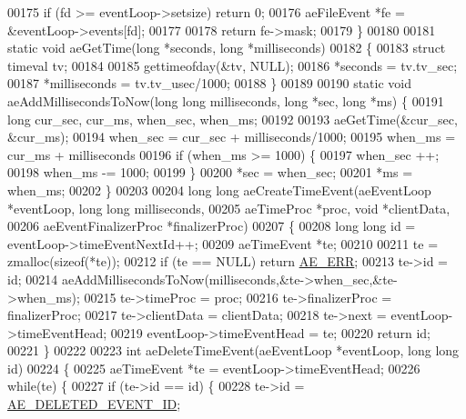 \begin{DoxyCode}
00175     \textcolor{keywordflow}{if} (fd >= eventLoop->setsize) \textcolor{keywordflow}{return} 0;
00176     aeFileEvent *fe = &eventLoop->events[fd];
00177 
00178     \textcolor{keywordflow}{return} fe->mask;
00179 \}
00180 
00181 \textcolor{keyword}{static} \textcolor{keywordtype}{void} aeGetTime(\textcolor{keywordtype}{long} *seconds, \textcolor{keywordtype}{long} *milliseconds)
00182 \{
00183     \textcolor{keyword}{struct} timeval tv;
00184 
00185     gettimeofday(&tv, NULL);
00186     *seconds = tv.tv\_sec;
00187     *milliseconds = tv.tv\_usec/1000;
00188 \}
00189 
00190 \textcolor{keyword}{static} \textcolor{keywordtype}{void} aeAddMillisecondsToNow(\textcolor{keywordtype}{long} \textcolor{keywordtype}{long} milliseconds, \textcolor{keywordtype}{long} *sec, \textcolor{keywordtype}{long} *ms) \{
00191     \textcolor{keywordtype}{long} cur\_sec, cur\_ms, when\_sec, when\_ms;
00192 
00193     aeGetTime(&cur\_sec, &cur\_ms);
00194     when\_sec = cur\_sec + milliseconds/1000;
00195     when\_ms = cur\_ms + milliseconds%
00196     \textcolor{keywordflow}{if} (when\_ms >= 1000) \{
00197         when\_sec ++;
00198         when\_ms -= 1000;
00199     \}
00200     *sec = when\_sec;
00201     *ms = when\_ms;
00202 \}
00203 
00204 \textcolor{keywordtype}{long} \textcolor{keywordtype}{long} aeCreateTimeEvent(aeEventLoop *eventLoop, \textcolor{keywordtype}{long} \textcolor{keywordtype}{long} milliseconds,
00205         aeTimeProc *proc, \textcolor{keywordtype}{void} *clientData,
00206         aeEventFinalizerProc *finalizerProc)
00207 \{
00208     \textcolor{keywordtype}{long} \textcolor{keywordtype}{long} id = eventLoop->timeEventNextId++;
00209     aeTimeEvent *te;
00210 
00211     te = zmalloc(\textcolor{keyword}{sizeof}(*te));
00212     \textcolor{keywordflow}{if} (te == NULL) \textcolor{keywordflow}{return} \hyperlink{ae_8h_aa16dcf7effdf8f8df97f51b1cb51a9df}{AE\_ERR};
00213     te->id = id;
00214     aeAddMillisecondsToNow(milliseconds,&te->when\_sec,&te->when\_ms);
00215     te->timeProc = proc;
00216     te->finalizerProc = finalizerProc;
00217     te->clientData = clientData;
00218     te->next = eventLoop->timeEventHead;
00219     eventLoop->timeEventHead = te;
00220     \textcolor{keywordflow}{return} id;
00221 \}
00222 
00223 \textcolor{keywordtype}{int} aeDeleteTimeEvent(aeEventLoop *eventLoop, \textcolor{keywordtype}{long} \textcolor{keywordtype}{long} id)
00224 \{
00225     aeTimeEvent *te = eventLoop->timeEventHead;
00226     \textcolor{keywordflow}{while}(te) \{
00227         \textcolor{keywordflow}{if} (te->id == id) \{
00228             te->id = \hyperlink{ae_8h_aee0b2fc7b62d8e06517136a91d7f635d}{AE\_DELETED\_EVENT\_ID};

\end{DoxyCode}
